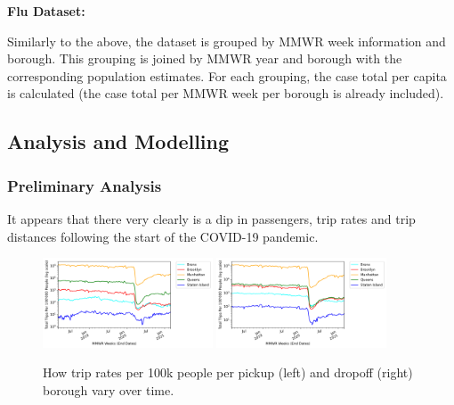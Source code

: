 \documentclass[11pt]{article}
\begin{document}
\textbf{Flu Dataset:}

Similarly to the above, the dataset is grouped by MMWR week information and borough.
This grouping is joined by MMWR year and borough with the corresponding population estimates.
For each grouping, the case total per capita is calculated (the case total per MMWR week per borough is already included).

\subsection{Analysis and Modelling}

\subsubsection{Preliminary Analysis}

It appears that there very clearly is a dip in passengers, 
trip rates and trip distances following the start of the COVID-19 pandemic.

\begin{figure}[h]
    \includegraphics[width=0.45\textwidth]{../plots/time-series-Total Trips Per 100'000 People (log scale)-vs-MMWR Weeks (End Dates)-by-pu_borough.png}
    \includegraphics[width=0.45\textwidth]{../plots/time-series-Total Trips Per 100'000 People (log scale)-vs-MMWR Weeks (End Dates)-by-do_borough.png}
    \centering
    \caption{How trip rates per 100k people per pickup (left) and dropoff (right) borough vary over time.} %
\end{figure}

\end{document}
